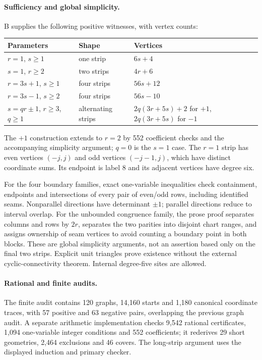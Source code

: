 \documentclass[11pt]{amsart}
\newcommand{\claimid}[1]{}
\theoremstyle{definition}\newtheorem{definition}[theorem]{Definition}
\begin{document}
\paragraph{Sufficiency and global simplicity.}\label{prop:route_b-sufficiency}
B supplies the following positive witnesses, with vertex counts:
\begin{center}\small
\begin{tabular}{lll}\toprule
Parameters & Shape & Vertices\\\midrule
$r=1$, $s\ge1$ & one strip & $6s+4$\\
$s=1$, $r\ge2$ & two strips & $4r+6$\\
$r=3s+1$, $s\ge1$ & four strips & $56s+12$\\
$r=3s-1$, $s\ge2$ & four strips & $56s-10$\\
$s=qr\pm1$, $r\ge3$, $q\ge1$ & alternating strips &
 $2q(3r+5s)+2$ for $+1$, $2q(3r+5s)$ for $-1$\\\bottomrule
\end{tabular}
\end{center}
The $+1$ construction extends to $r=2$ by 552 coefficient checks
and the accompanying simplicity argument; $q=0$ is the $s=1$ case.
The $r=1$ strip has even vertices $(-j,j)$ and odd vertices
$(-j-1,j)$, which have distinct coordinate sums. Its endpoint is
label 8 and its adjacent vertices have degree six.

For the four boundary families, exact one-variable inequalities check
containment, endpoints and intersections of every pair of even/odd
rows, including identified seams. Nonparallel directions have
determinant $\pm1$; parallel directions reduce to interval overlap.
For the unbounded congruence family, the prose proof separates
columns and rows by $2r$, separates the two parities into disjoint
chart ranges, and assigns ownership of seam vertices to avoid counting
a boundary point in both blocks. These are global simplicity
arguments, not an assertion based only on the final two strips.
Explicit unit triangles prove existence without the external
cyclic-connectivity theorem. Internal degree-five sites are allowed.
\claimid{prop:route_b-sufficiency}

\paragraph{Rational and finite audits.}\label{prop:route_b-reproduction}
The finite audit contains 120 graphs, 14,160 starts and 1,180 canonical
coordinate traces, with 57 positive and 63 negative pairs, overlapping
the previous graph audit. A separate arithmetic implementation checks
9,542 rational certificates, 1,094 one-variable integer conditions
and 552 coefficients; it rederives 29 short geometries, 2,464 exclusions
and 46 covers. The long-strip argument uses the displayed induction
and primary checker.
\claimid{prop:route_b-reproduction}
\end{document}
